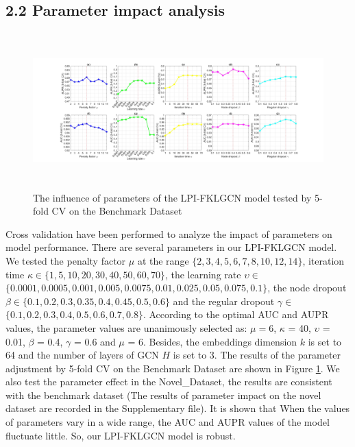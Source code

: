 \documentclass[fleqn,10pt]{wlscirep}
\begin{document}
\subsection*{2.2 Parameter impact analysis}
\begin{figure}[ht]
\centering
\graphicspath{ {./images/} }
\includegraphics[height=6cm,width=17.5cm]{fig2.jpg}
\caption{The influence of parameters of the LPI-FKLGCN model tested by 5-fold CV on the Benchmark Dataset}
\label{fig:fig2-1}
\end{figure}

Cross validation have been performed to analyze the impact of parameters on model performance. There are several parameters in our LPI-FKLGCN model. We tested the penalty factor $\mu$ at the range $\{2,3,4,5,6,7,8,10,12,14\}$, iteration time $\kappa$$\in$$\{1,5,10,20,30,40,50,60,70\}$, the learning rate $\upsilon$$ \in $$\{0.0001,0.0005,0.001,0.005,0.0075,0.01,0.025,0.05,0.075,0.1\}$, the node dropout $\beta$$\in$$\{0.1,0.2,0.3,0.35,0.4,0.45,0.5,0.6\}$ and the regular dropout $\gamma$$\in$$\{0.1,0.2,0.3,0.4,0.5,0.6,0.7,0.8\}$. According to the optimal AUC and AUPR values, the parameter values are unanimously selected as: $\mu=6$, $\kappa$ = 40, $\upsilon$ = 0.01, $\beta$ = 0.4, $\gamma$ = 0.6 and $\mu$ = 6. Besides, the embeddings dimension $k$ is set to 64 and the number of layers of GCN $H$ is set to 3. The results of the parameter adjustment by 5-fold CV on the Benchmark Dataset are shown in Figure \ref{fig:fig2-1}. We also test the parameter effect in the Novel\_Dataset, the results are consistent with the benchmark dataset (The results of parameter impact on the novel dataset are recorded in the Supplementary file). It is shown that When the values of parameters vary in a wide range, the AUC and AUPR values of the model fluctuate little. So, our LPI-FKLGCN model is robust. 

\end{document}

